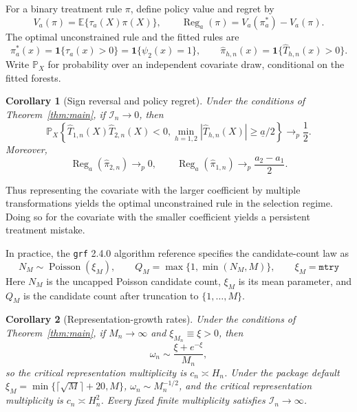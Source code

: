 \documentclass[12pt]{article}
\newtheorem{corollary}{Corollary}
\newcommand{\E}{\mathbb E}
\newcommand{\Prb}{\mathbb P}
\newcommand{\one}{\mathbf 1}
\newcommand{\Pois}{\operatorname{Poisson}}
\begin{document}
For a binary treatment rule \(\pi\), define policy value and regret by
\[
V_a(\pi)=\E\{\tau_a(X)\pi(X)\},
\qquad
\operatorname{Reg}_a(\pi)=V_a(\pi_a^*)-V_a(\pi).
\]
The optimal unconstrained rule and the fitted rules are
\[
\pi_a^*(x)=\one\{\tau_a(x)>0\}=\one\{\psi_2(x)=1\},
\qquad
\widehat\pi_{h,n}(x)=\one\{\widehat T_{h,n}(x)>0\}.
\]
Write \(\Prb_X\) for probability over an independent covariate draw, conditional on the fitted forests.

\begin{corollary}[Sign reversal and policy regret]\label{cor:sign}
Under the conditions of Theorem~\ref{thm:main}, if \(\mathcal I_n\to0\), then
\begin{equation}\label{eq:sign-reversal}
\Prb_X\!\left\{\widehat T_{1,n}(X)\widehat T_{2,n}(X)<0,
\min_{h=1,2}|\widehat T_{h,n}(X)|\ge\underline a/2\right\}
\longrightarrow_p\frac12.
\end{equation}
Moreover,
\begin{equation}\label{eq:regret}
\operatorname{Reg}_a(\widehat\pi_{2,n})\longrightarrow_p0,
\qquad
\operatorname{Reg}_a(\widehat\pi_{1,n})
\longrightarrow_p\frac{a_2-a_1}{2}.
\end{equation}
\end{corollary}

Thus representing the covariate with the larger coefficient by multiple transformations yields the optimal unconstrained rule in the selection regime. Doing so for the covariate with the smaller coefficient yields a persistent treatment mistake.

In practice, the \texttt{grf} 2.4.0 algorithm reference \citep{grfreference} specifies the candidate-count law as
\begin{equation}\label{eq:poisson-count}
N_M\sim\Pois(\xi_M),
\qquad
Q_M=\max\{1,\min(N_M,M)\},
\qquad
\xi_M=\texttt{mtry}
\end{equation}
Here \(N_M\) is the uncapped Poisson candidate count, \(\xi_M\) is its mean parameter, and \(Q_M\) is the candidate count after truncation to \(\{1,\ldots,M\}\).

\begin{corollary}[Representation-growth rates]\label{cor:boundary}
Under the conditions of Theorem~\ref{thm:main}, if \(M_n\to\infty\) and \(\xi_{M_n}\equiv\xi>0\), then
\[
\omega_n\sim\frac{\xi+e^{-\xi}}{M_n},
\]
so the critical representation multiplicity is \(c_n\asymp H_n\). Under the package default \(\xi_M=\min\{\lceil\sqrt M\rceil+20,M\}\), \(\omega_n\sim M_n^{-1/2}\), and the critical representation multiplicity is \(c_n\asymp H_n^2\). Every fixed finite multiplicity satisfies \(\mathcal I_n\to\infty\).
\end{corollary}
\end{document}
